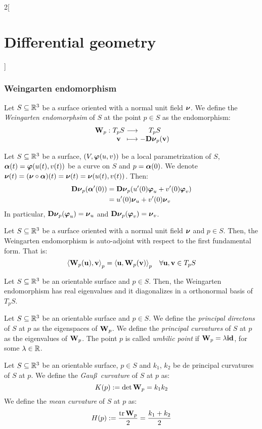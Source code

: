 \documentclass[../../../main.tex]{subfiles}
\begin{document}
\begin{multicols}{2}[\section{Differential geometry}]
  \subsubsection{Weingarten endomorphism}
  \begin{definition}
    Let $S\subseteq\mathbb{R}^3$ be a surface oriented with a normal unit field $\boldsymbol{\mathrm{\nu}}$. We define the \emph{Weingarten endomorphsim} of $S$ at the point $p\in S$ as the endomorphism: $$\function{\vf{W}_p}{T_pS}{T_pS}{\vf{v}}{-\vf{D\vf\nu}_p(\vf{v})}$$
  \end{definition}
  \begin{lemma}
    Let $S\subseteq\mathbb{R}^3$ be a surface, $(V,\boldsymbol{\mathrm{\varphi}}(u,v))$ be a local parametrization of $S$, $\boldsymbol{\mathrm{\alpha}}(t)=\boldsymbol{\mathrm{\varphi}}(u(t),v(t))$ be a curve on $S$ and $p=\boldsymbol{\mathrm{\alpha}}(0)$. We denote $\boldsymbol{\mathrm{\nu}}(t)=(\boldsymbol{\mathrm{\nu}}\circ\boldsymbol{\mathrm{\alpha}})(t)=\boldsymbol{\mathrm{\nu}}(t)=\boldsymbol{\mathrm{\nu}}(u(t),v(t))$. Then:
    \begin{align*}
      \boldsymbol{\mathrm{D\nu}}_p(\boldsymbol{\mathrm{\alpha}}'(0)) & =\boldsymbol{\mathrm{D\nu}}_p(u'(0)\boldsymbol{\mathrm{\varphi}}_u+v'(0)\boldsymbol{\mathrm{\varphi}}_v) \\
                                 & =u'(0)\boldsymbol{\mathrm{\nu}}_u+v'(0)\boldsymbol{\mathrm{\nu}}_v
    \end{align*}
    In particular, $\boldsymbol{\mathrm{D\nu}}_p(\boldsymbol{\mathrm{\varphi}}_u)=\boldsymbol{\mathrm{\nu}}_u$ and $\boldsymbol{\mathrm{D\nu}}_p(\boldsymbol{\mathrm{\varphi}}_v)=\boldsymbol{\mathrm{\nu}}_v$.
  \end{lemma}
  \begin{proposition}
    Let $S\subseteq\mathbb{R}^3$ be a surface oriented with a normal unit field $\boldsymbol{\mathrm{\nu}}$ and $p\in S$. Then, the Weingarten endomorphism is auto-adjoint with respect to the first fundamental form. That is: $${\langle \boldsymbol{\mathrm{W}}_p(\boldsymbol{\mathrm{u}}),\boldsymbol{\mathrm{v}}\rangle}_p={\langle \boldsymbol{\mathrm{u}},\boldsymbol{\mathrm{W}}_p(\boldsymbol{\mathrm{v}})\rangle}_p\quad\forall\boldsymbol{\mathrm{u}},\boldsymbol{\mathrm{v}}\in T_pS$$
  \end{proposition}
  \begin{proposition}
    Let $S\subseteq\mathbb{R}^3$ be an orientable surface and $p\in S$. Then, the Weingarten endomorphism has real eigenvalues and it diagonalizes in a orthonormal basis of $T_pS$.
  \end{proposition}
  \begin{definition}
    Let $S\subseteq\mathbb{R}^3$ be an orientable surface and $p\in S$. We define the \emph{principal directons} of $S$ at $p$ as the eigenspaces of $\boldsymbol{\mathrm{W}}_p$. We define the \emph{principal curvatures} of $S$ at $p$ as the eigenvalues of $\boldsymbol{\mathrm{W}}_p$. The point $p$ is called \emph{umbilic point} if $\boldsymbol{\mathrm{W}}_p=\lambda \boldsymbol{\mathrm{id}}$, for some $\lambda\in\mathbb{R}$.
  \end{definition}
  \begin{definition}
    Let $S\subseteq\mathbb{R}^3$ be an orientable surface, $p\in S$ and $k_1$, $k_2$ be de principal curvatures of $S$ at $p$. We define the \emph{Gau\ss\ curvature} of $S$ at $p$ as:
    $$K(p):=\det\boldsymbol{\mathrm{W}}_p=k_1k_2$$
    We define the \emph{mean curvature} of $S$ at $p$ as:
    $$H(p):=\frac{\trace\vf{W}_p}{2}=\frac{k_1+k_2}{2}$$
  \end{definition}

\end{multicols}
\end{document}
